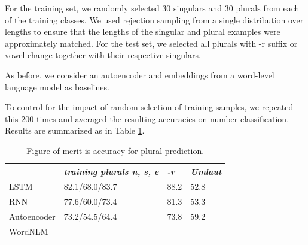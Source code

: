 For the training set, we randomly selected 30 singulars and 30 plurals from each of the training classes.
We used rejection sampling from a single distribution over lengths to ensure that the lengths of the singular and plural examples were approximately matched.
For the test set, we selected all plurals with -r suffix or vowel change together with their respective singulars.

As before, we consider an autoencoder and embeddings from a word-level language model as baselines.

To control for the impact of random selection of training samples, we repeated this 200 times and averaged the resulting accuracies on number classification.
Results are summarized as in Table \ref{tab:number-results}.


\begin{table}[t]
  \begin{center}
    \begin{tabular}{l|l|l|l}
      \multicolumn{1}{c}{}&\emph{training plurals n, s, e}&\emph{-r}&\emph{Umlaut}\\
      \hline
      LSTM& 82.1/68.0/83.7  & 88.2 & 52.8 \\
      RNN& 77.6/60.0/73.4 & 81.3 & 53.3\\
      Autoencoder& 73.2/54.5/64.4 & 73.8 & 59.2\\
      WordNLM&   \\ %
    \end{tabular}
  \end{center}
  \caption{\label{tab:number-results} Figure of merit is accuracy for plural prediction.}
\end{table}



